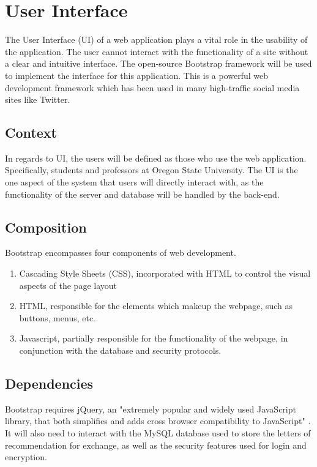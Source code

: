 \documentclass[onecolumn, draftclsnofoot,10pt, compsoc]{IEEEtran}
\begin{document}
\section{User Interface}
The User Interface (UI) of a web application plays a vital role in the usability of the application. The user cannot interact with the functionality of a site without a clear and intuitive interface. The open-source Bootstrap framework will be used to implement the interface for this application. This is a powerful web development framework which has been used in many high-traffic social media sites like Twitter.

\subsection{Context}
In regards to UI, the users will be defined as those who use the web application. Specifically, students and professors at Oregon State University. The UI is the one aspect of the system that users will directly interact with, as the functionality of the server and database will be handled by the back-end.

\subsection{Composition}
Bootstrap encompasses four components of web development.
\begin{enumerate}
    \item Cascading Style Sheets (CSS), incorporated with HTML to control the visual aspects of the page layout
    \item HTML, responsible for the elements which makeup the webpage, such as buttons, menus, etc.
    \item Javascript, partially responsible for the functionality of the webpage, in conjunction with the database and security protocols.
\end{enumerate}

\subsection{Dependencies}
Bootstrap requires jQuery, an "extremely popular and widely used JavaScript library, that both simplifies and adds cross browser compatibility to JavaScript" \cite{rascia}. It will also need to interact with the MySQL database used to store the letters of recommendation for exchange, as well as the security features used for login and encryption.
\end{document}
